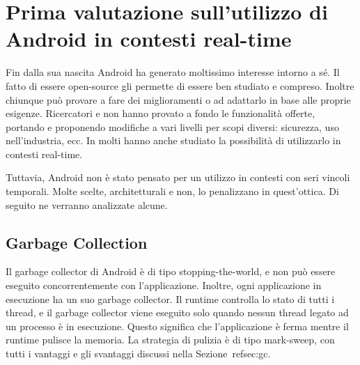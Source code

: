 \section{Prima valutazione sull'utilizzo di Android in contesti real-time}
Fin dalla sua nascita Android ha generato moltissimo interesse intorno a sé. Il fatto di essere open-source gli permette di essere ben studiato e compreso. Inoltre chiunque può provare a fare dei miglioramenti o ad adattarlo in base alle proprie esigenze. Ricercatori e non hanno provato a fondo le funzionalità offerte, portando e proponendo modifiche a vari livelli per scopi diversi: sicurezza, uso nell'industria, ecc. In molti hanno anche studiato la possibilità di utilizzarlo in contesti real-time. 

Tuttavia, Android non è stato pensato per un utilizzo in contesti con seri vincoli temporali. Molte scelte, architetturali e non, lo penalizzano in quest'ottica. Di seguito ne verranno analizzate alcune.

\subsection{Garbage Collection}
Il garbage collector di Android è di tipo stopping-the-world, e non può essere eseguito concorrentemente con l'applicazione. Inoltre, ogni applicazione in esecuzione ha un suo garbage collector. Il runtime controlla lo stato di tutti i thread, e il garbage collector viene eseguito solo quando nessun thread legato ad un processo è in esecuzione. Questo significa che l'applicazione è ferma mentre il runtime pulisce la memoria. La strategia di pulizia è di tipo mark-sweep, con tutti i vantaggi e gli svantaggi discussi nella Sezione~ref{sec:gc}.


